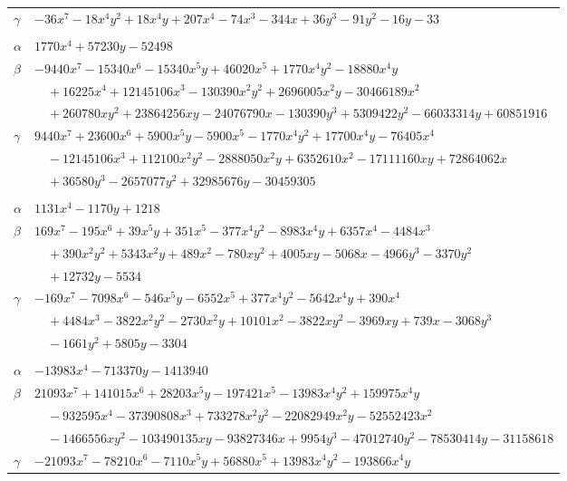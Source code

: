 \documentclass[11pt]{article}
\begin{document}
\begin{longtable}{@{}ll@{}}
$\gamma$ & $-36x^{7}-18x^{4}y^{2}+18x^{4}y+207x^{4}-74x^{3}-344x+36y^{3}-91y^{2}-16y-33$\\
\addlinespace[3pt]
\multicolumn{2}{@{}l}{$\{i,j\}=\{51,89\}$, $k_{ij}=2^{2}\cdot 3\cdot 7\cdot 13^{2}$}\\
$\alpha$ & $1770x^{4}+57230y-52498$\\
$\beta$ & $-9440x^{7}-15340x^{6}-15340x^{5}y+46020x^{5}+1770x^{4}y^{2}-18880x^{4}y$\\
 & $\quad +16225x^{4}+12145106x^{3}-130390x^{2}y^{2}+2696005x^{2}y-30466189x^{2}$\\
 & $\quad +260780xy^{2}+23864256xy-24076790x-130390y^{3}+5309422y^{2}-66033314y+60851916$\\
$\gamma$ & $9440x^{7}+23600x^{6}+5900x^{5}y-5900x^{5}-1770x^{4}y^{2}+17700x^{4}y-76405x^{4}$\\
 & $\quad -12145106x^{3}+112100x^{2}y^{2}-2888050x^{2}y+6352610x^{2}-17111160xy+72864062x$\\
 & $\quad +36580y^{3}-2657077y^{2}+32985676y-30459305$\\
\addlinespace[3pt]
\multicolumn{2}{@{}l}{$\{i,j\}=\{51,96\}$, $k_{ij}=2^{4}\cdot 3^{2}$}\\
$\alpha$ & $1131x^{4}-1170y+1218$\\
$\beta$ & $169x^{7}-195x^{6}+39x^{5}y+351x^{5}-377x^{4}y^{2}-8983x^{4}y+6357x^{4}-4484x^{3}$\\
 & $\quad +390x^{2}y^{2}+5343x^{2}y+489x^{2}-780xy^{2}+4005xy-5068x-4966y^{3}-3370y^{2}$\\
 & $\quad +12732y-5534$\\
$\gamma$ & $-169x^{7}-7098x^{6}-546x^{5}y-6552x^{5}+377x^{4}y^{2}-5642x^{4}y+390x^{4}$\\
 & $\quad +4484x^{3}-3822x^{2}y^{2}-2730x^{2}y+10101x^{2}-3822xy^{2}-3969xy+739x-3068y^{3}$\\
 & $\quad -1661y^{2}+5805y-3304$\\
\addlinespace[3pt]
\multicolumn{2}{@{}l}{$\{i,j\}=\{51,104\}$, $k_{ij}=2\cdot 7\cdot 13^{2}$}\\
$\alpha$ & $-13983x^{4}-713370y-1413940$\\
$\beta$ & $21093x^{7}+141015x^{6}+28203x^{5}y-197421x^{5}-13983x^{4}y^{2}+159975x^{4}y$\\
 & $\quad -932595x^{4}-37390808x^{3}+733278x^{2}y^{2}-22082949x^{2}y-52552423x^{2}$\\
 & $\quad -1466556xy^{2}-103490135xy-93827346x+9954y^{3}-47012740y^{2}-78530414y-31158618$\\
$\gamma$ & $-21093x^{7}-78210x^{6}-7110x^{5}y+56880x^{5}+13983x^{4}y^{2}-193866x^{4}y$\\

\end{longtable}
\end{document}
